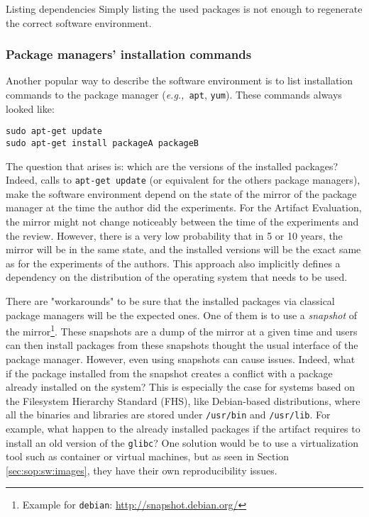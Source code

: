 \documentclass[sigconf,natbib=false]{acmart}
\newcommand{\eg}{\emph{e.g.,}}
\newcommand{\aeval}{Artifact Evaluation}
\begin{document}
\begin{lesson}{Listing dependencies}{}
  Simply listing the used packages is not enough to regenerate the correct software environment.
\end{lesson}

\subsubsection{Package managers' installation commands}

Another popular way to describe the software environment is to list installation commands to the package manager (\eg\ \texttt{apt}, \texttt{yum}).
These commands always looked like:

\begin{verbatim}
sudo apt-get update
sudo apt-get install packageA packageB
\end{verbatim}

The question that arises is: which are the versions of the installed packages?
Indeed, calls to \texttt{apt-get update} (or equivalent for the others package managers), make the software environment depend on the state of the mirror of the package manager at the time the author did the experiments.
For the \aeval, the mirror might not change noticeably between the time of the experiments and the review.
However, there is a very low probability that in 5 or 10 years, the mirror will be in the same state, and the installed versions will be the exact same as for the experiments of the authors.
This approach also implicitly defines a dependency on the distribution of the operating system that needs to be used.

There are "workarounds" to be sure that the installed packages via classical package managers will be the expected ones. 
One of them is to use a \emph{snapshot} of the mirror\footnote{Example for \texttt{debian}: \url{http://snapshot.debian.org/}}.
These snapshots are a dump of the mirror at a given time and users can then install packages from these snapshots thought the usual interface of the package manager.
However, even using snapshots can cause issues.
Indeed, what if the package installed from the snapshot creates a conflict with a package already installed on the system?
This is especially the case for systems based on the Filesystem Hierarchy Standard (FHS), like Debian-based distributions, where all the binaries and libraries are stored under \texttt{/usr/bin} and \texttt{/usr/lib}.
For example, what happen to the already installed packages if the artifact requires to install an old version of the \texttt{glibc}? 
One solution would be to use a virtualization tool such as container or virtual machines, but as seen in Section \ref{sec:sop:sw:images}, they have their own reproducibility issues.
\end{document}
